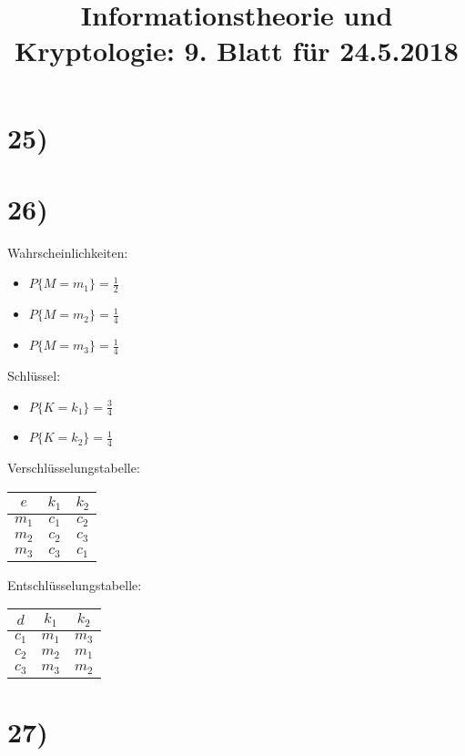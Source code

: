 %



  \title{Informationstheorie und Kryptologie: 9. Blatt für 24.5.2018}
  \maketitle

  \section*{25)}

  \section*{26)}

  \begin{multicols}{2}
    Wahrscheinlichkeiten:

    \begin{itemize}
      \item $P\{M = m_1\} = \frac{1}{2}$
      \item $P\{M = m_2\} = \frac{1}{4}$
      \item $P\{M = m_3\} = \frac{1}{4}$
    \end{itemize}

    \columnbreak

    Schlüssel:

    \begin{itemize}
      \item $P\{K = k_1\} = \frac{3}{4}$
      \item $P\{K = k_2\} = \frac{1}{4}$
    \end{itemize}
  \end{multicols}

  \begin{multicols}{2}
    Verschlüsselungstabelle:

    \begin{tabular}{|*3{c|}}
      \hline
      $e$ & $k_1$ & $k_2$ \\
      \hline
      $m_1$ & $c_1$ & $c_2$ \\
      $m_2$ & $c_2$ & $c_3$ \\
      $m_3$ & $c_3$ & $c_1$ \\
      \hline
    \end{tabular}

    \columnbreak

    Entschlüsselungstabelle:

    \begin{tabular}{|*3{c|}}
      \hline
      $d$ & $k_1$ & $k_2$ \\
      \hline
      $c_1$ & $m_1$ & $m_3$ \\
      $c_2$ & $m_2$ & $m_1$ \\
      $c_3$ & $m_3$ & $m_2$ \\
      \hline
    \end{tabular}
  \end{multicols}


  \section*{27)}

